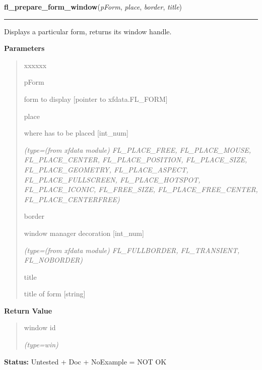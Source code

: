 \hspace{.8\funcindent}\begin{boxedminipage}{\funcwidth}

    \raggedright \textbf{fl\_prepare\_form\_window}(\textit{pForm}, \textit{place}, \textit{border}, \textit{title})

    \vspace{-1.5ex}

    \rule{\textwidth}{0.5\fboxrule}
\setlength{\parskip}{2ex}
    Displays a particular form, returns its window handle.

\setlength{\parskip}{1ex}
      \textbf{Parameters}
      \vspace{-1ex}

      \begin{quote}
        \begin{Ventry}{xxxxxx}

          \item[pForm]

          form to display [pointer to xfdata.FL\_FORM]

          \item[place]

          where has to be placed [int\_num]

            {\it (type=(from xfdata module) FL\_PLACE\_FREE, FL\_PLACE\_MOUSE, FL\_PLACE\_CENTER, 
FL\_PLACE\_POSITION, FL\_PLACE\_SIZE, FL\_PLACE\_GEOMETRY, 
FL\_PLACE\_ASPECT, FL\_PLACE\_FULLSCREEN, FL\_PLACE\_HOTSPOT, 
FL\_PLACE\_ICONIC, FL\_FREE\_SIZE, FL\_PLACE\_FREE\_CENTER, 
FL\_PLACE\_CENTERFREE)}

          \item[border]

          window manager decoration [int\_num]

            {\it (type=(from xfdata module) FL\_FULLBORDER, FL\_TRANSIENT, FL\_NOBORDER)}

          \item[title]

          title of form [string]

        \end{Ventry}

      \end{quote}

      \textbf{Return Value}
    \vspace{-1ex}

      \begin{quote}
      window id

      {\it (type=win)}

      \end{quote}

\textbf{Status:} Untested + Doc + NoExample = NOT OK



    \end{boxedminipage}

